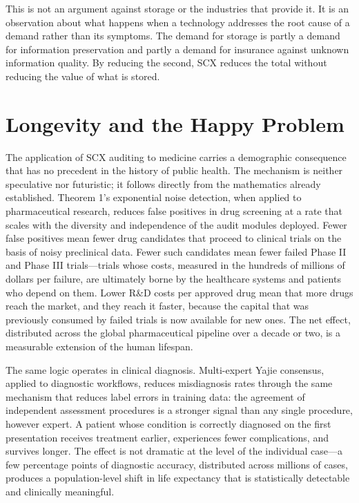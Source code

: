 \documentclass[12pt,a4paper]{article}
\begin{document}
This is not an argument against storage or the industries that provide it. It is an observation about what happens when a technology addresses the root cause of a demand rather than its symptoms. The demand for storage is partly a demand for information preservation and partly a demand for insurance against unknown information quality. By reducing the second, SCX reduces the total without reducing the value of what is stored.

\section{Longevity and the Happy Problem}

The application of SCX auditing to medicine carries a demographic consequence that has no precedent in the history of public health. The mechanism is neither speculative nor futuristic; it follows directly from the mathematics already established. Theorem 1's exponential noise detection, when applied to pharmaceutical research, reduces false positives in drug screening at a rate that scales with the diversity and independence of the audit modules deployed. Fewer false positives mean fewer drug candidates that proceed to clinical trials on the basis of noisy preclinical data. Fewer such candidates mean fewer failed Phase II and Phase III trials---trials whose costs, measured in the hundreds of millions of dollars per failure, are ultimately borne by the healthcare systems and patients who depend on them. Lower R\&D costs per approved drug mean that more drugs reach the market, and they reach it faster, because the capital that was previously consumed by failed trials is now available for new ones. The net effect, distributed across the global pharmaceutical pipeline over a decade or two, is a measurable extension of the human lifespan.

The same logic operates in clinical diagnosis. Multi-expert Yajie consensus, applied to diagnostic workflows, reduces misdiagnosis rates through the same mechanism that reduces label errors in training data: the agreement of independent assessment procedures is a stronger signal than any single procedure, however expert. A patient whose condition is correctly diagnosed on the first presentation receives treatment earlier, experiences fewer complications, and survives longer. The effect is not dramatic at the level of the individual case---a few percentage points of diagnostic accuracy, distributed across millions of cases, produces a population-level shift in life expectancy that is statistically detectable and clinically meaningful.
\end{document}
